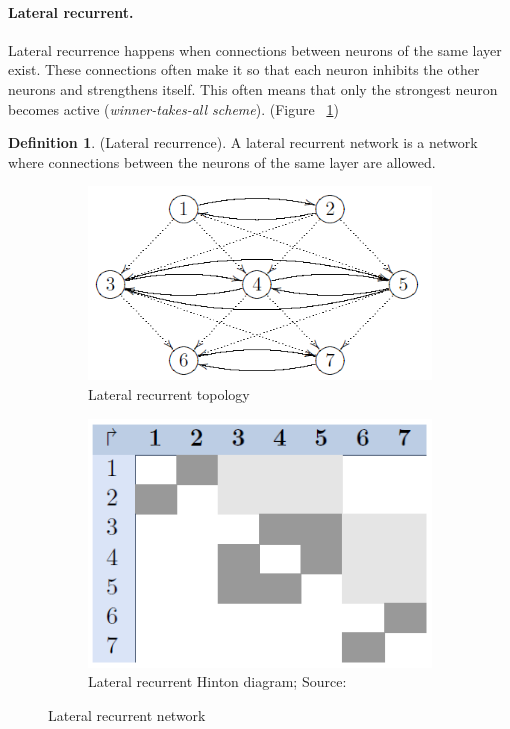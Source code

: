 \documentclass[pdftex,a4paper,12pt,twoside]{report}
\theoremstyle{plain} \newtheorem{theorem}{Theorem} \newtheorem{proposition}{Proposition} \newtheorem{lemma}{Lemma} \newtheorem*{corollary}{Corollary}
\theoremstyle{definition} \newtheorem{definition}{Definition} \newtheorem{conjecture}{Conjecture} \newtheorem*{example}{Example} \newtheorem{algorithm}{Algorithm}
\theoremstyle{remark} \newtheorem*{remark}{Remark} \newtheorem*{note}{Note} \newtheorem{case}{Case}
\begin{document}
\paragraph{Lateral recurrent.}
Lateral recurrence happens when connections between neurons of the same layer exist. These connections often make it so that each neuron inhibits the other neurons and strengthens itself. This often means that only the strongest neuron becomes active (\emph{winner-takes-all scheme}). (Figure ~\ref{fig:lateralrecurrence})
\begin{definition}
(Lateral recurrence). A lateral recurrent network is a network where connections between the neurons of the same layer are allowed.
\end{definition}
\begin{figure}
\centering
	\begin{subfigure}[b]{0.3\textwidth}
	\centering
	\includegraphics[width=\textwidth]{./img/recurrent-lateral-Topology.png}
	\caption{Lateral recurrent topology}
	\end{subfigure}
	\begin{subfigure}[b]{0.3\textwidth}
	\centering
	\includegraphics[width=\textwidth]{./img/recurrent-lateral-Hinton.png}
	\caption{Lateral recurrent Hinton diagram; Source:\citep{Kriesel2013}}
	\end{subfigure}
\caption{Lateral recurrent network}
\label{fig:lateralrecurrence}
\end{figure}
\end{document}
